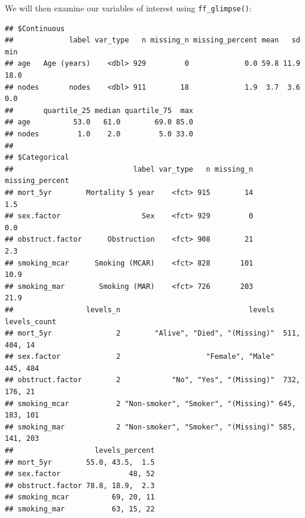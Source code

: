 \documentclass[
  12pt,
  krantz2]{krantz}
\makeatletter
\newenvironment{Shaded}{\begin{snugshade}}{\end{snugshade}}
\newcommand{\KeywordTok}[1]{\textcolor[rgb]{0.13,0.29,0.53}{\textbf{#1}}}
\newcommand{\NormalTok}[1]{#1}
\newcommand{\OperatorTok}[1]{\textcolor[rgb]{0.81,0.36,0.00}{\textbf{#1}}}
\newcommand{\StringTok}[1]{\textcolor[rgb]{0.31,0.60,0.02}{#1}}
\newenvironment{kframe}{%
\medskip{}
\setlength{\fboxsep}{.8em}
 \def\at@end@of@kframe{}%
 \ifinner\ifhmode%
  \def\at@end@of@kframe{\end{minipage}}%
  \begin{minipage}{\columnwidth}%
 \fi\fi%
 \def\FrameCommand##1{\hskip\@totalleftmargin \hskip-\fboxsep
 \colorbox{shadecolor}{##1}\hskip-\fboxsep
     \hskip-\linewidth \hskip-\@totalleftmargin \hskip\columnwidth}%
 \MakeFramed {\advance\hsize-\width
   \@totalleftmargin\z@ \linewidth\hsize
   \@setminipage}}%
 {\par\unskip\endMakeFramed%
 \at@end@of@kframe}
\renewenvironment{Shaded}{\begin{kframe}}{\end{kframe}}
\makeatother
\begin{document}
We will then examine our variables of interest using \texttt{ff\_glimpse()}:

\begin{Shaded}
\end{Shaded}

\begin{verbatim}
## $Continuous
##             label var_type   n missing_n missing_percent mean   sd  min
## age   Age (years)    <dbl> 929         0             0.0 59.8 11.9 18.0
## nodes       nodes    <dbl> 911        18             1.9  3.7  3.6  0.0
##       quartile_25 median quartile_75  max
## age          53.0   61.0        69.0 85.0
## nodes         1.0    2.0         5.0 33.0
## 
## $Categorical
##                            label var_type   n missing_n missing_percent
## mort_5yr        Mortality 5 year    <fct> 915        14             1.5
## sex.factor                   Sex    <fct> 929         0             0.0
## obstruct.factor      Obstruction    <fct> 908        21             2.3
## smoking_mcar      Smoking (MCAR)    <fct> 828       101            10.9
## smoking_mar        Smoking (MAR)    <fct> 726       203            21.9
##                 levels_n                              levels  levels_count
## mort_5yr               2        "Alive", "Died", "(Missing)"  511, 404, 14
## sex.factor             2                    "Female", "Male"      445, 484
## obstruct.factor        2            "No", "Yes", "(Missing)"  732, 176, 21
## smoking_mcar           2 "Non-smoker", "Smoker", "(Missing)" 645, 183, 101
## smoking_mar            2 "Non-smoker", "Smoker", "(Missing)" 585, 141, 203
##                   levels_percent
## mort_5yr        55.0, 43.5,  1.5
## sex.factor                48, 52
## obstruct.factor 78.8, 18.9,  2.3
## smoking_mcar          69, 20, 11
## smoking_mar           63, 15, 22
\end{verbatim}
\end{document}
